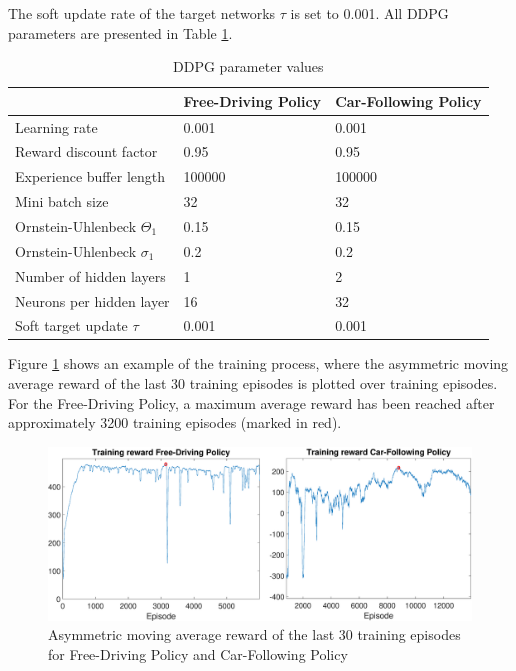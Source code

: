 \documentclass[review]{elsarticle}
\providecommand{\martinc}[1]{}                  %
\providecommand{\3}{{\ss}}
\begin{document}
	\martinc{Einheitenbehaftet, also in $\unit[]{m/s^2}$ oder
		ist der action space skaliert gem\"a\3 der 2. Komponente des State
		Vektors?} The soft update rate of the target networks $\tau$ is set to
	0.001.\martinc{Och, noch eine Tiefpass-Zeitvariable der Gr\"o\3e
		0.001. Welche von den beiden ist $\tau$?}
	All DDPG parameters are presented in Table \ref{tab:DDPGparameters}.
	\begin{table}
		\caption{DDPG parameter values} 
		\label{tab:DDPGparameters} 
		\begin{center}
			\begin{tabular}{ p{} p{0.2\textwidth}  p{} }
				& Free-Driving Policy & Car-Following Policy \\ \hline
				Learning rate & 0.001 & 0.001\\ 
				Reward discount factor & 0.95 & 0.95 \\ 
				Experience buffer length & 100000 & 100000 \\ 
				Mini batch size & 32 & 32 \\ 			
				Ornstein-Uhlenbeck  $\Theta_1$ & 0.15& 0.15 \\ 
				Ornstein-Uhlenbeck  $\sigma_1$ & 0.2 & 0.2 \\				
				Number of hidden layers & 1 & 2\\
				Neurons per hidden layer & 16 & 32\\
				Soft target update  $\tau$ & 0.001 & 0.001\\
				
				
			\end{tabular}
		\end{center}
	\end{table}
	\martinc{Evtl. diese Abb vorziehen. Manche Journals wollen Bilder in
		der Reihenfolge der ersten Erwaehnung im Haupttext}
	Figure \ref{fig:TrainingReward} shows an example of the training
	process, where the asymmetric moving average reward of the last 30 training episodes is plotted over training episodes. For the Free-Driving Policy, a maximum average reward has been reached after approximately 3200 training episodes (marked in red).
	\begin{figure}
		\centering
		\includegraphics[width=12cm]{images/TrainingReward}
		\caption{Asymmetric moving average reward of the last 30 training episodes for Free-Driving Policy and Car-Following Policy} 
		\label{fig:TrainingReward}
	\end{figure}
	
\end{document}
